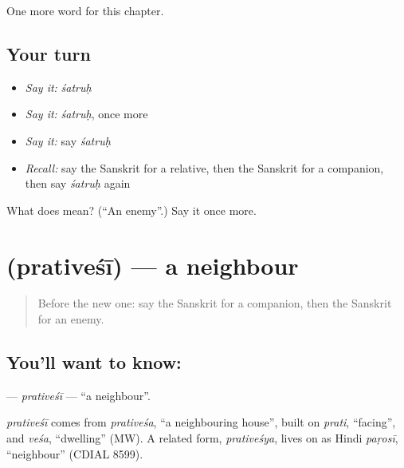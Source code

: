 \begin{grammarlens}[title={What you've built}]
One more word for this chapter.
\end{grammarlens}

\subsection*{Your turn}
\begin{itemize}
\raggedright
  \item \emph{Say it:} \emph{śatruḥ}
  \item \emph{Say it:} \emph{śatruḥ}, once more
  \item \emph{Say it:} say \emph{śatruḥ}
  \item \emph{Recall:} say the Sanskrit for a relative, then the Sanskrit for a companion, then say \emph{śatruḥ} again
\end{itemize}

\begin{tcolorbox}[breakable,colback=teal!4,colframe=teal!35!black,title={Before you move on}]
What does  mean? (\textquotedblleft{}An enemy\textquotedblright{}.) Say it once more.
\end{tcolorbox}
\section[\texorpdfstring{\sk{प्रतिवेशी} (prativeśī)}{प्रतिवेशी (prativeśī)}]{ (prativeśī) — a neighbour}

\label{lesson:SA-C208-prativesi}



\begin{quote}
Before the new one: say the Sanskrit for a companion, then the Sanskrit for an enemy.
\end{quote}

\subsection*{You'll want to know: }
\textbf{} — \emph{prativeśī} — \textquotedblleft{}a neighbour\textquotedblright{}.

\begin{cousinweb}
\emph{prativeśī} comes from \emph{prativeśa}, \textquotedblleft{}a neighbouring house\textquotedblright{}, built on \emph{prati}, \textquotedblleft{}facing\textquotedblright{}, and \emph{veśa}, \textquotedblleft{}dwelling\textquotedblright{} (MW). A related form, \emph{prativeśya}, lives on as Hindi \emph{paṛosī}, \textquotedblleft{}neighbour\textquotedblright{} (CDIAL 8599).
\end{cousinweb}


